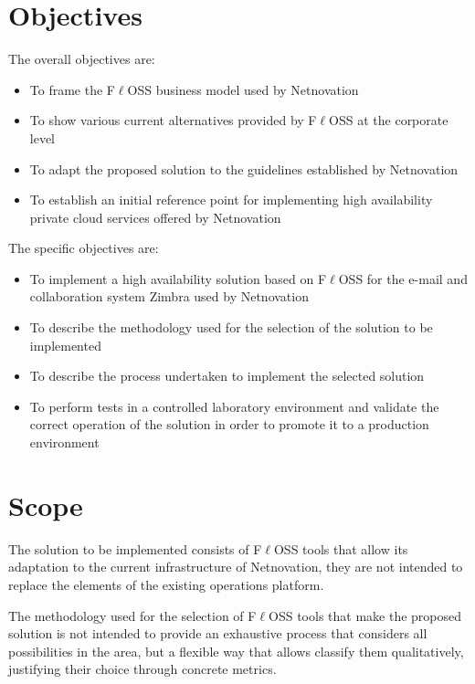 \documentclass[a4paper, 12pt]{book}
\begin{document}
\section{Objectives}
\label{sec:objectives}

The overall objectives are:

\begin{itemize}
	\item To frame the F$\ell$OSS business model used by Netnovation
	\item To show various current alternatives provided by F$\ell$OSS at the corporate level
	\item To adapt the proposed solution to the guidelines established by Netnovation
	\item To establish an initial reference point for implementing high availability private cloud services offered by Netnovation
\end{itemize}

\noindent The specific objectives are:

\begin{itemize}
	\item To implement a high availability solution based on F$\ell$OSS for the e-mail and collaboration system Zimbra used by Netnovation
	\item To describe the methodology used for the selection of the solution to be implemented
	\item To describe the process undertaken to implement the selected solution
	\item To perform tests in a controlled laboratory environment and validate the correct operation of the solution in order to promote it to a production environment
\end{itemize}


\section{Scope}
\label{sec:scope}

The solution to be implemented consists of F$\ell$OSS tools that allow its adaptation to the current infrastructure of Netnovation, they are not intended to replace the elements of the existing operations  platform.\bigskip

\noindent The methodology used for the selection of F$\ell$OSS tools that make the proposed solution is not intended to provide an exhaustive process that considers all possibilities in the area, but a flexible way that allows classify them qualitatively, justifying their choice through concrete metrics.\bigskip
\end{document}
